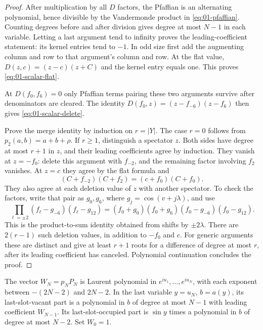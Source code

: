 \begin{proof}
After multiplication by all $D$ factors, the Pfaffian is an alternating
polynomial, hence divisible by the Vandermonde product in
\eqref{eq:01-pfaffian}. Counting degrees before and after division
gives degree at most $N-1$ in each variable. Letting a last argument
tend to infinity proves the leading-coefficient statement: its kernel
entries tend to $-1$. In odd size first add the augmenting column and
row to that argument's column and row. At the flat value,
$D(z,c)=(z-c)(z+C)$ and the kernel entry equals one. This proves
\eqref{eq:01-scalar-flat}.

At $D(f_0,f_6)=0$ only Pfaffian terms pairing these two arguments
survive after denominators are cleared. The identity
$D(f_0,z)=(z-f_{-6})(z-f_6)$ then gives
\eqref{eq:01-scalar-delete}.

Prove the merge identity by induction on $r=|Y|$. The case $r=0$
follows from $p_2(a,b)=a+b+\rho$. If $r\ge1$, distinguish a spectator
$z$. Both sides have degree at most $r+1$ in $z$, and their leading
coefficients agree by induction. They vanish at $z=-f_0$: delete
this argument with $f_{-2}$, and the remaining factor involving
$f_2$ vanishes. At $z=c$ they agree by the flat formula and
\[
 (C+f_{-2})(C+f_2)=(c+f_0)(C+f_0).
\]
They also agree at each deletion value of $z$ with another spectator.
To check the factors, write that pair as $g_0,g_6$, where
$g_j=\cos(v+j\lambda)$, and use
\[
 \prod_{\ell=\pm2}(f_\ell-g_{-6})(f_\ell-g_{12})
 =(f_0+g_0)(f_0+g_6)(f_0-g_{-6})(f_0-g_{12}).
\]
This is the product-to-sum identity obtained from shifts by
$\pm2\lambda$. There are $2(r-1)$ such deletion values, in addition
to $-f_0$ and $c$. For generic arguments these are distinct and give
at least $r+1$ roots for a difference of degree at most $r$, after
its leading coefficient has canceled. Polynomial continuation concludes
the proof.
\end{proof}

\begin{lemma}\label{lem:vacuum-degree}
The vector $W_N=p_NP_N$ is Laurent polynomial in $e^{iu_1},\ldots,e^{iu_N}$,
with each exponent between $-(2N-2)$ and $2N-2$. In the last variable
$y=u_N$, $b=a(y)$, its last-slot-vacant part is a polynomial in $b$
of degree at most $N-1$ with leading coefficient $W_{N-1}$.
Its last-slot-occupied part is $\sin y$ times a polynomial in $b$ of
degree at most $N-2$. Set $W_0=1$.
\end{lemma}

